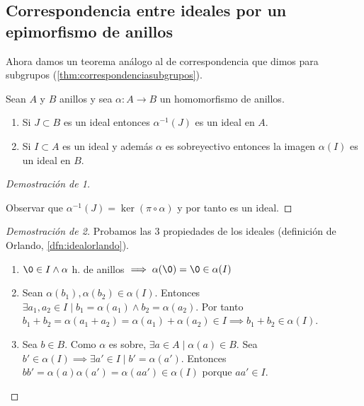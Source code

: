 \subsection{Correspondencia entre ideales por un epimorfismo de anillos}

Ahora damos un teorema análogo al de correspondencia que dimos para subgrupos (\autoref{thm:correspondenciasubgrupos}).

\begin{thm}
	Sean $A$ y $B$ anillos y sea $\alpha: A \to B$ un homomorfismo de anillos.
	\begin{enumerate}
		\item Si $J \subset B$ es un ideal entonces $\alpha^{-1}(J)$ es un ideal en $A$.
		\item Si $I \subset A$ es un ideal y además $\alpha$ es sobreyectivo entonces la imagen $\alpha(I)$ es un ideal en $B$.
	\end{enumerate}
\end{thm}

\begin{proof}[Demostración de 1]
	\begin{figure}[h]
		\centering
	\end{figure}
	Observar que $\alpha^{-1}(J) = \ker (\pi \circ \alpha)$ y por tanto es un ideal.
\end{proof}

\begin{proof}[Demostración de 2]
	Probamos las 3 propiedades de los ideales (definición de Orlando, \autoref{dfn:idealorlando}).
	\begin{enumerate}
		\item $\0 \in I \land \alpha$ h. de anillos $\implies \alpha(\0) = \0 \in \alpha(I)$
		\item Sean $\alpha(b_1), \alpha(b_2) \in \alpha(I)$. Entonces $\exists a_1, a_2 \in I \mid b_1 = \alpha(a_1) \land b_2 = \alpha(a_2)$. Por tanto $b_1 + b_2 = \alpha(a_1 + a_2) = \alpha(a_1) + \alpha(a_2) \in I \implies b_1 + b_2 \in \alpha(I)$.
		\item Sea $b \in B$. Como $\alpha$ es sobre, $\exists a \in A \mid \alpha(a) \in B$. Sea $b' \in \alpha(I) \implies \exists a' \in I \mid b' = \alpha(a')$. Entonces $bb' = \alpha(a) \alpha(a') = \alpha(aa') \in \alpha(I)$ porque $aa' \in I$.
	\end{enumerate}
\end{proof}

